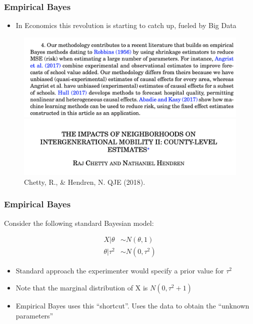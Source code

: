 \documentclass[
  shownotes,
  xcolor={svgnames},
  hyperref={colorlinks,citecolor=DarkBlue,linkcolor=DarkRed,urlcolor=DarkBlue}
  ]{beamer}
\begin{document}
\begin{frame}[fragile]
\frametitle{Empirical Bayes}

\begin{itemize}
\item In Economics this revolution is starting to catch up, fueled by Big Data
\end{itemize}

\begin{figure}[H] \centering
  \centering
  \includegraphics[scale=0.4]{figures/Chetty_n_Hendren_QJE_1.png}
  \includegraphics[scale=0.4]{figures/Chetty_n_Hendren_QJE_2.png}
  \\
  \tiny Chetty, R., \& Hendren, N. QJE (2018). 
\end{figure}

\end{frame}

\begin{frame}[fragile]
\frametitle{Empirical Bayes}

Consider the following standard Bayesian model:

\bigskip

\begin{align}
X|\theta &\sim N(\theta,1) \\
\theta|\tau^2 &\sim N(0,\tau^2)
\end{align}

\bigskip
\begin{itemize}
  \item Standard approach the experimenter would specify a prior value for $\tau^2$
  \item Note that the marginal distribution of X is $N(0,\tau^2+1)$
  \item Empirical Bayes uses this ``shortcut''. Uses the data to obtain the ``unknown parameters''
\end{itemize}

\end{frame}
\end{document}
